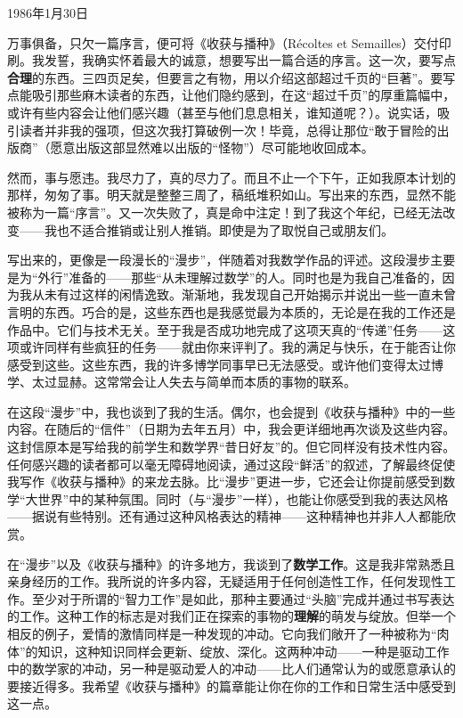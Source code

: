 
1986年1月30日

万事俱备，只欠一篇序言，便可将《收获与播种》（Récoltes et Semailles）交付印刷。我发誓，我确实怀着最大的诚意，想要写出一篇合适的序言。这一次，要写点\textbf{合理}的东西。三四页足矣，但要言之有物，用以介绍这部超过千页的“巨著”。要写点能吸引那些麻木读者的东西，让他们隐约感到，在这“超过千页”的厚重篇幅中，或许有些内容会让他们感兴趣（甚至与他们息息相关，谁知道呢？）。说实话，吸引读者并非我的强项，但这次我打算破例一次！毕竟，总得让那位“敢于冒险的出版商”（愿意出版这部显然难以出版的“怪物”）尽可能地收回成本。

然而，事与愿违。我尽力了，真的尽力了。而且不止一个下午，正如我原本计划的那样，匆匆了事。明天就是整整三周了，稿纸堆积如山。写出来的东西，显然不能被称为一篇“序言”。又一次失败了，真是命中注定！到了我这个年纪，已经无法改变——我也不适合推销或让别人推销。即使是为了取悦自己或朋友们。

写出来的，更像是一段漫长的“漫步”，伴随着对我数学作品的评述。这段漫步主要是为“外行”准备的——那些“从未理解过数学”的人。同时也是为我自己准备的，因为我从未有过这样的闲情逸致。渐渐地，我发现自己开始揭示并说出一些一直未曾言明的东西。巧合的是，这些东西也是我感觉最为本质的，无论是在我的工作还是作品中。它们与技术无关。至于我是否成功地完成了这项天真的“传递”任务——这项或许同样有些疯狂的任务——就由你来评判了。我的满足与快乐，在于能否让你感受到这些。这些东西，我的许多博学同事早已无法感受。或许他们变得太过博学、太过显赫。这常常会让人失去与简单而本质的事物的联系。

在这段“漫步”中，我也谈到了我的生活。偶尔，也会提到《收获与播种》中的一些内容。在随后的“信件”（日期为去年五月）中，我会更详细地再次谈及这些内容。这封信原本是写给我的前学生和数学界“昔日好友”的。但它同样没有技术性内容。任何感兴趣的读者都可以毫无障碍地阅读，通过这段“鲜活”的叙述，了解最终促使我写作《收获与播种》的来龙去脉。比“漫步”更进一步，它还会让你提前感受到数学“大世界”中的某种氛围。同时（与“漫步”一样），也能让你感受到我的表达风格——据说有些特别。还有通过这种风格表达的精神——这种精神也并非人人都能欣赏。

在“漫步”以及《收获与播种》的许多地方，我谈到了\textbf{数学工作}。这是我非常熟悉且亲身经历的工作。我所说的许多内容，无疑适用于任何创造性工作，任何发现性工作。至少对于所谓的“智力工作”是如此，那种主要通过“头脑”完成并通过书写表达的工作。这种工作的标志是对我们正在探索的事物的\textbf{理解}的萌发与绽放。但举一个相反的例子，爱情的激情同样是一种发现的冲动。它向我们敞开了一种被称为“肉体”的知识，这种知识同样会更新、绽放、深化。这两种冲动——一种是驱动工作中的数学家的冲动，另一种是驱动爱人的冲动——比人们通常认为的或愿意承认的要接近得多。我希望《收获与播种》的篇章能让你在你的工作和日常生活中感受到这一点。

